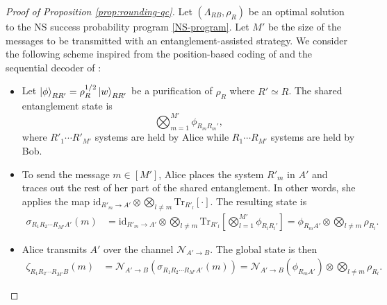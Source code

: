 \documentclass[a4paper,onecolumn,11pt,accepted=2025-10-01]{quantumarticle}
\DeclareMathOperator{\suc}{Succ}
\newcommand*{\cN}{\mathcal{N}}
\newcommand*{\cS}{\mathcal{S}}
\newcommand*{\id}{\mathrm{id}}
\newcommand*{\tr}[1]{\mathrm{Tr}\left[#1\right]}
\newcommand*{\ptr}[2]{\mathrm{Tr}_{#1}\left[#2\right]}
\newcommand*{\mle}{\preccurlyeq}
\begin{document}
\begin{proof}[Proof of Proposition \ref{prop:rounding-qc}]
Let $(\Lambda_{RB}, \rho_{R})$ be an optimal solution to  the NS success probability program \eqref{NS-program}. 
Let $M'$ be the size of the messages to be transmitted with an entanglement-assisted strategy. 
We consider the following scheme inspired from the  position-based coding of \cite{Anshu2018Jun} and the sequential decoder of \cite{Wilde2013Sep}:
\begin{itemize}
    \item[\textbf{Shared entanglement.}] Let $\ket{\phi}_{RR'} = \rho_R^{1/2}\ket{w}_{RR'}$ be a purification of $\rho_{R}$ where $R'\simeq R$. The shared entanglement state is 
    \begin{equation}
        \bigotimes_{m=1}^{M'} \phi_{R_mR_m'},
    \end{equation}
    where $R'_1\cdots R'_{M'}$ systems are held by Alice while $R_1\cdots R_{M'}$ systems are held by Bob.
    \item[\textbf{Encoding.}] To send the message $m\in [M']$, Alice places  the system $R'_m$ in $A'$ and traces out the rest of her part of the shared entanglement.  In other words, she applies the map $\id_{R'_m\rightarrow A'}\otimes \bigotimes_{l\neq m}\ptr{R'_{l}}{\cdot}$. The resulting state is 
    \begin{align}
        \sigma_{R_1R_2\cdots R_{M'} A'}(m) &= \id_{R'_m\rightarrow A'}\otimes \bigotimes_{l\neq m}\ptr{R'_{l}}{ \textstyle \bigotimes_{l=1}^{M'} \phi_{R_{l}R_{l}'} } 
        = \phi_{R_m A'}\otimes \bigotimes_{l\neq m} \rho_{R_l}.   
    \end{align}
    \item[\textbf{Transmission.}] Alice transmits $A'$ over the channel $\cN_{A'\rightarrow B}$. The global state is then 
    \begin{align}
        \zeta_{R_1R_2\cdots R_{M'} B}(m) &= \cN_{A'\rightarrow B}(\sigma_{R_1R_2\cdots R_{M'} A'}(m))
        =\cN_{A'\rightarrow B}\left(\phi_{R_m A'}\right)\otimes \bigotimes_{l\neq m} \rho_{R_l}.
    \end{align}

\end{itemize}
\end{proof}
\end{document}
